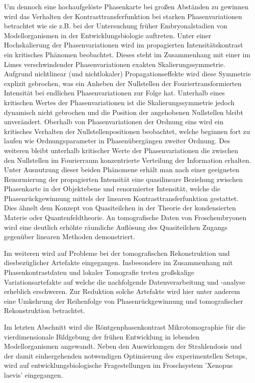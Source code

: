 \documentclass[
twoside,
openright,
titlepage,
numbers=noenddot,
headinclude,
fleqn,
a4paper,
footinclude=true,
cleardoublepage=empty,
abstractoff,
BCOR=5mm,
paper=a4,
fontsize=11pt,
british,ngerman,american,
]{scrreprt}
\begin{document}
Um dennoch eine hochaufgelöste Phasenkarte bei großen Abständen zu
gewinnen wird das Verhalten der Kontrasttransferfunktion bei starken
Phasenvariationen betrachtet wie sie z.B. bei der Untersuchung früher
Embryonalstadien von Modellorganismen in der Entwicklungsbiologie
auftreten.  Unter einer Hochskalierung der Phasenvariationen wird im
propagierten Intensitätskontrast ein kritisches Phänomen beobachtet.
Dieses steht im Zusammenhang mit einer im Limes verschwindender
Phasenvariationen exakten Skalierungssymmetrie.  Aufgrund nichtlinear
(und nichtlokaler) Propagationseffekte wird diese Symmetrie explizit
gebrochen, was ein Anheben der Nullstellen der Fouriertransformierten
Intensität bei endlichen Phasenvariationen zur Folge hat.  Unterhalb
eines kritischen Wertes der Pha\-sen\-va\-ri\-a\-tio\-nen ist die
Skalierungssymmetrie jedoch dynamisch nicht gebrochen und die Position
der angehobenen Nullstellen bleibt unverändert.  Oberhalb von
Phasenvariationen der Ordnung eins wird ein kritisches Verhalten der
Nullstellenpositionen beobachtet, welche beginnen fort zu laufen wie
Ordnungsparameter in Phasenübergängen zweiter Ordnung.  Des weiteren
bleibt unterhalb kritischer Werte der Phasenvariationen die zwischen
den Nullstellen im Fourierraum konzentrierte Verteilung der
Information erhalten.  Unter Ausnutzung dieser beiden Phänomene erhält
man nach einer geeigneten Re\-nor\-mier\-ung der propagierten Intensität
eine quasilineare Beziehung zwischen Phasenkarte in der Objektebene
und renormierter Intensität, welche die Phasenrückgewinnung mittels
der linearen Kontrasttransferfunktion gestattet.  Dies ähnelt dem
Konzept von Quasiteilchen in der Theorie der kondensierten Materie
oder Quantenfeldtheorie.  An tomografische Daten von Froschembryonen
wird eine deutlich erhöhte räumliche Auflösung des Quasiteilchen\hyph
Zugangs gegenüber linearen Methoden demonstriert.

Im weiteren wird auf Probleme bei der tomografischen Rekonstruktion
und diesbezüglicher Artefakte eingegangen.  Insbesondere im
Zusammenhang mit Phasenkontrastdaten und lokaler Tomografie treten
großskalige Variationsartefakte auf welche die nachfolgende
Datenverarbeitung und -analyse erheblich erschweren.  Zur Reduktion
solche Artefakte wird hier unter anderem eine Umkehrung der
Reihenfolge von Phasenrückgewinnung und tomografischer Rekonstruktion
betrachtet.
 
Im letzten Abschnitt wird die Röntgenphasenkontrast\hyph
Mikrotomographie für die vierdimensionale Bildgebung der frühen
Entwicklung in lebenden Modellorganismen angewandt.  Neben den
Auswirkungen der Strahlendosis und der damit einhergehenden
notwendigen Optimierung des experimentellen Setups, wird auf
entwicklungsbiologische Fragestellungen im Froschsystem 'Xenopus
laevis' eingegangen.
\end{document}
